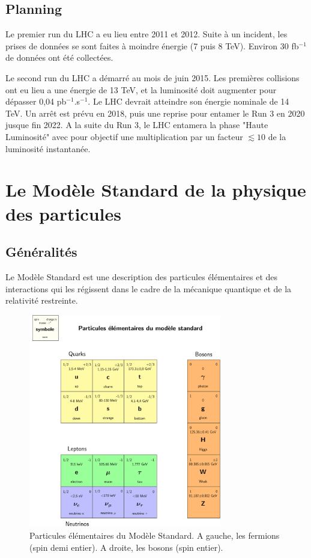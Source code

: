 \documentclass[11pt]{article} %
\begin{document}
\subsection{Planning}

Le premier \og run \fg du LHC a eu lieu entre 2011 et 2012. Suite à un incident, les prises de données se sont faites à moindre énergie (7 puis 8 TeV). Environ 30 fb${}^{ -1}$ de données ont été collectées.

Le second run du LHC a démarré au mois de juin 2015. Les premières collisions ont eu lieu a une énergie de 13 TeV, et la luminosité doit augmenter pour dépasser 0,04 pb${}^{-1}$.s${}^{-1}$. Le LHC devrait atteindre son énergie nominale de 14 TeV. Un arrêt est prévu en 2018, puis une reprise pour entamer le Run 3 en 2020 jusque fin 2022. A la suite du Run 3, le LHC entamera la phase "Haute Luminosité" avec pour objectif une multiplication par un facteur $\lesssim 10$ de la luminosité instantanée.

\section{Le Modèle Standard de la physique des particules}

\subsection{Généralités}

Le Modèle Standard est une description des particules élémentaires et des interactions qui les régissent dans le cadre de la mécanique quantique et de la relativité restreinte. 

\begin{figure}[H]
\centering
  \caption{ Particules élémentaires du Modèle Standard. A gauche, les fermions (spin demi entier). A droite, les bosons (spin entier). }
\includegraphics[width=0.75\textwidth]{table_ms.pdf}

\end{figure}
\end{document}
